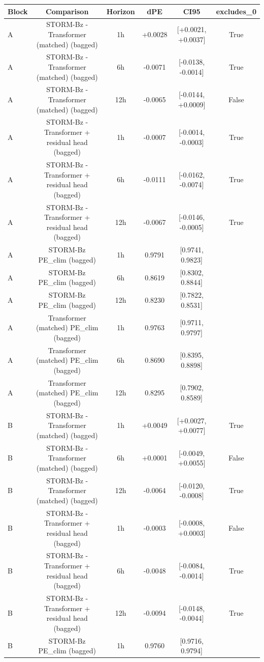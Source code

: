 \begin{tabular}{lccccc}
\toprule
Block & Comparison & Horizon & dPE & CI95 & excludes\_0 \\
\midrule
A & STORM-Bz - Transformer (matched) (bagged) & 1h & +0.0028 & [+0.0021, +0.0037] & True \\
A & STORM-Bz - Transformer (matched) (bagged) & 6h & -0.0071 & [-0.0138, -0.0014] & True \\
A & STORM-Bz - Transformer (matched) (bagged) & 12h & -0.0065 & [-0.0144, +0.0009] & False \\
A & STORM-Bz - Transformer + residual head (bagged) & 1h & -0.0007 & [-0.0014, -0.0003] & True \\
A & STORM-Bz - Transformer + residual head (bagged) & 6h & -0.0111 & [-0.0162, -0.0074] & True \\
A & STORM-Bz - Transformer + residual head (bagged) & 12h & -0.0067 & [-0.0146, -0.0005] & True \\
A & STORM-Bz PE\_clim (bagged) & 1h & 0.9791 & [0.9741, 0.9823] &  \\
A & STORM-Bz PE\_clim (bagged) & 6h & 0.8619 & [0.8302, 0.8844] &  \\
A & STORM-Bz PE\_clim (bagged) & 12h & 0.8230 & [0.7822, 0.8531] &  \\
A & Transformer (matched) PE\_clim (bagged) & 1h & 0.9763 & [0.9711, 0.9797] &  \\
A & Transformer (matched) PE\_clim (bagged) & 6h & 0.8690 & [0.8395, 0.8898] &  \\
A & Transformer (matched) PE\_clim (bagged) & 12h & 0.8295 & [0.7902, 0.8589] &  \\
B & STORM-Bz - Transformer (matched) (bagged) & 1h & +0.0049 & [+0.0027, +0.0077] & True \\
B & STORM-Bz - Transformer (matched) (bagged) & 6h & +0.0001 & [-0.0049, +0.0055] & False \\
B & STORM-Bz - Transformer (matched) (bagged) & 12h & -0.0064 & [-0.0120, -0.0008] & True \\
B & STORM-Bz - Transformer + residual head (bagged) & 1h & -0.0003 & [-0.0008, +0.0003] & False \\
B & STORM-Bz - Transformer + residual head (bagged) & 6h & -0.0048 & [-0.0084, -0.0014] & True \\
B & STORM-Bz - Transformer + residual head (bagged) & 12h & -0.0094 & [-0.0148, -0.0044] & True \\
B & STORM-Bz PE\_clim (bagged) & 1h & 0.9760 & [0.9716, 0.9794] &  \\

\end{tabular}
